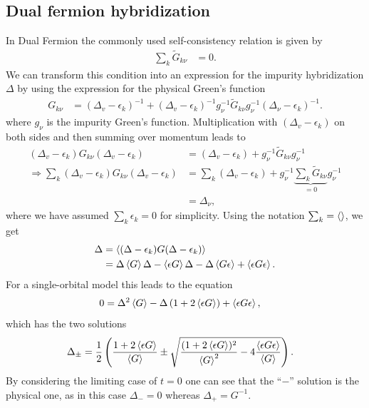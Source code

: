 \documentclass[12pt,a4paper]{scrartcl}
\numberwithin{equation}{section}
\begin{document}
\clearpage

\subsection{Dual fermion hybridization}
In Dual Fermion the commonly used self-consistency relation is given by
\begin{align}
 \sum_k \tilde{G}_{k\nu} &=0.
\end{align}
We can transform
this condition into an expression for the impurity hybridization $\Delta$ by using
the expression for the physical Green's function
\begin{align}
 G_{k\nu} &= (\Delta_v - \epsilon_k)^{-1} + (\Delta_v - \epsilon_k)^{-1} g_{\nu}^{-1} \tilde{G}_{k\nu}g_{\nu}^{-1} (\Delta_{\nu} - \epsilon_k)^{-1}.
\end{align}
where $g_{\nu}$ is the impurity Green's function.
Multiplication with $(\Delta_v - \epsilon_k)$ on both sides and then summing over momentum leads to
\begin{align}
 (\Delta_v - \epsilon_k)G_{k\nu}(\Delta_v - \epsilon_k) &= (\Delta_v - \epsilon_k) + g_{\nu}^{-1} \tilde{G}_{k\nu}g_{\nu}^{-1} \\
 \Rightarrow \sum_k (\Delta_v - \epsilon_k)G_{k\nu}(\Delta_v - \epsilon_k) &= \sum_k (\Delta_v - \epsilon_k) + g_{\nu}^{-1} \underbrace{\sum_k\tilde{G}_{k\nu}}_{=0}g_{\nu}^{-1} \\
 &= \Delta_{\nu},
\end{align}
where we have assumed $\sum_k \epsilon_k=0$ for simplicity. Using the notation $\sum_k = \braket{}$, we get
\begin{align}
 \Delta &= \braket{ (\Delta - \epsilon_k)G(\Delta - \epsilon_k) } \\
  &=  \Delta \braket{ G } \Delta - \braket{\epsilon G }\Delta - \Delta\braket{ G \epsilon } + \braket{\epsilon G \epsilon }  .
\end{align}
For a single-orbital model this leads to the equation
\begin{align}
 0 &= \Delta^2 \braket{G} - \Delta\left( 1 + 2\braket{\epsilon G } \right) + \braket{\epsilon G \epsilon }  ,
\end{align}
which has the two solutions
\begin{align}
 \Delta_{\pm} &= \frac{1}{2}\left(
           \frac{1 + 2\braket{\epsilon G } }{\braket{G}}
           \pm \sqrt{ \frac{ (1 + 2\braket{\epsilon G }  )^2}{\braket{G}^2}  - 4\frac{\braket{\epsilon G \epsilon}}{\braket{G}} }
          \right)  .
\end{align}
By considering the limiting case of $t=0$ one can see that the ``$-$'' solution is the physical one, 
as in this case $\Delta_- = 0$ whereas $\Delta_+ = G^{-1}$.
\end{document}
